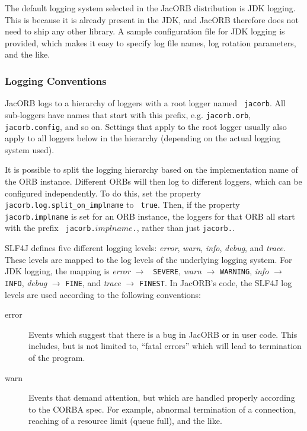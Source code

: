{{The default logging system selected in the JacORB distribution is JDK
logging.  This is because it is already present in the JDK, and JacORB
therefore does not need to ship any other library.  A sample
configuration file for JDK logging is provided, which makes it easy to
specify log file names, log rotation parameters, and the like.

\subsubsection{Logging Conventions}

JacORB logs to a hierarchy of loggers with a root logger named {\tt
  jacorb}.  All sub-loggers have names that start with this prefix,
e.g. {\tt jacorb.orb}, {\tt jacorb.config}, and so on.  Settings that
apply to the root logger usually also apply to all loggers below in
the hierarchy (depending on the actual logging system used).

It is possible to split the logging hierarchy based on the
implementation name of the ORB instance.  Different ORBs will then log
to different loggers, which can be configured independently.  To do
this, set the property {\tt jacorb.log.split\_on\_implname} to {\tt
  true}.  Then, if the property {\tt jacorb.implname} is set for an
ORB instance, the loggers for that ORB all start with the prefix {\tt
  jacorb.$implname$.}, rather than just {\tt jacorb.}.

SLF4J defines five different logging levels: \emph{error},
\emph{warn}, \emph{info}, \emph{debug}, and \emph{trace}.  These
levels are mapped to the log levels of the underlying logging system.
For JDK logging, the mapping is \emph{error} $\rightarrow$ {\tt
  SEVERE}, \emph{warn} $\rightarrow$ {\tt WARNING}, \emph{info}
$\rightarrow$ {\tt INFO}, \emph{debug} $\rightarrow$ {\tt FINE}, and
\emph{trace} $\rightarrow$ {\tt FINEST}.  In JacORB's code, the
SLF4J log levels are used according to the following conventions:

\begin{description}
\item[error] Events which suggest that there is a bug in JacORB or in
  user code.  This includes, but is not limited to, ``fatal errors''
  which will lead to termination of the program.

\item[warn] Events that demand attention, but which are handled
  properly according to the CORBA spec.  For example, abnormal
  termination of a connection, reaching of a resource limit (queue
  full), and the like.


\end{description}}}
